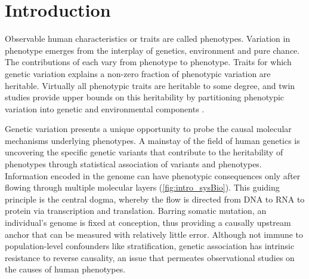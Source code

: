 %
%


\chapter{Introduction}
\label{ch:introduction}

\begin{outline}

Observable human characteristics or traits are called phenotypes.
Variation in phenotype emerges from the interplay of genetics, environment and pure chance.
The contributions of each vary from phenotype to phenotype.
Traits for which genetic variation explains a non-zero fraction of phenotypic variation are heritable.
Virtually all phenotypic traits are heritable to some degree, 
and twin studies provide upper bounds on this heritability by partitioning phenotypic variation into genetic and environmental components \autocite{polderman2015MetaanalysisHeritabilityHuman}.

Genetic variation presents a unique opportunity to probe the causal molecular mechanisms underlying phenotypes.
A mainstay of the field of human genetics is uncovering the specific genetic variants that contribute to the heritability of phenotypes through statistical association of variants and phenotypes.
Information encoded in the genome can have phenotypic consequences only after flowing through multiple molecular layers (\cref{fig:intro_sysBio}).
This guiding principle is the central dogma, whereby the flow is directed from DNA to RNA to protein via transcription and translation.
Barring somatic mutation, an individual's genome is fixed at conception, thus providing a causally upstream anchor that can be measured with relatively little error.
Although not immune to population-level confounders like stratification,
genetic association has intrinsic resistance to reverse causality, an issue that permeates observational studies on the causes of human phenotypes.


\end{outline}
